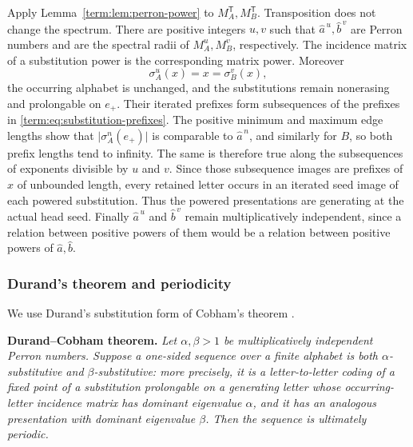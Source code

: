 \documentclass[11pt]{article}
\theoremstyle{definition}
\theoremstyle{remark}
\begin{document}
Apply Lemma~\ref{term:lem:perron-power} to
$M_A^{\mathsf T},M_B^{\mathsf T}$.  Transposition does not change the
spectrum.  There are positive integers $u,v$ such that
$\widehat a^{\,u},\widehat b^{\,v}$ are Perron numbers and are the spectral
radii of $M_A^u,M_B^v$, respectively.  The incidence matrix of a substitution
power is the corresponding matrix power.
Moreover
\[
 \sigma_A^u(x)=x=\sigma_B^v(x),
\]
the occurring alphabet is unchanged, and the substitutions remain
nonerasing and prolongable on \(e_+\).  Their iterated prefixes form
subsequences of the prefixes in \eqref{term:eq:substitution-prefixes}.  The
positive minimum and maximum edge lengths show that
\(\lvert\sigma_A^n(e_+)\rvert\) is comparable to \(\widehat a^{\,n}\), and
similarly for \(B\), so both prefix lengths tend to infinity.  The same is
therefore true along the subsequences of exponents divisible by \(u\) and
\(v\).  Since those subsequence images are prefixes of \(x\) of unbounded
length, every retained letter occurs in an iterated seed image of each
powered substitution.  Thus the powered presentations are generating at
the actual head seed.  Finally \(\widehat a^{\,u}\) and
\(\widehat b^{\,v}\) remain multiplicatively independent, since a relation
between positive powers of them would be a relation between positive powers
of \(\widehat a,\widehat b\).

\subsubsection{Durand's theorem and periodicity}

We use Durand's substitution form of Cobham's theorem
\cite[Definition 2 and Theorem 1]{Durand}.

\medskip
\noindent\textbf{Durand--Cobham theorem.}
\emph{Let \(\alpha,\beta>1\) be multiplicatively independent Perron
numbers.  Suppose a one-sided sequence over a finite alphabet is both
\(\alpha\)-substitutive and \(\beta\)-substitutive: more precisely, it is a
letter-to-letter coding of a fixed point of a substitution prolongable on a
generating letter whose occurring-letter incidence matrix has dominant
eigenvalue \(\alpha\), and it has an analogous presentation with dominant
eigenvalue \(\beta\).  Then the sequence is ultimately periodic.}
\medskip
\end{document}
